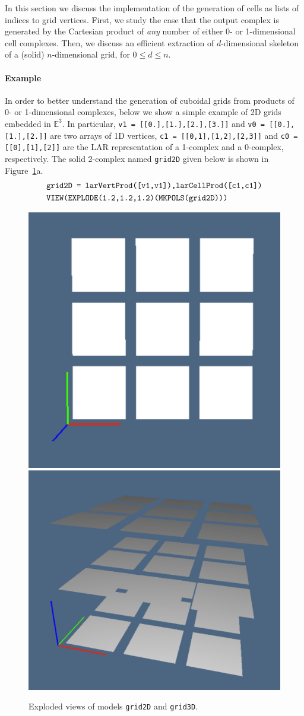\documentclass[11pt,oneside]{article}	%
\def\E{\mathbb{E}}
\begin{document}
In this section we discuss the implementation of the generation of cells as lists of indices to grid vertices. First, we study the case that the output complex is generated by the Cartesian product of \emph{any} number of either 0- or 1-dimensional cell complexes. Then, we discuss an efficient extraction of $d$-dimensional skeleton of a (solid) $n$-dimensional grid, for $0\leq d\leq n$.


\paragraph{Example}
In order to better understand the generation of cuboidal grids from products of 0- or 1-dimensional complexes, below we show a simple example of 2D grids embedded in $\E^3$.
In particular, \texttt{v1 = [[0.],[1.],[2.],[3.]]} and \texttt{v0 = [[0.],[1.],[2.]]} are two arrays of 1D vertices, \texttt{c1 = [[0,1],[1,2],[2,3]]} and \texttt{c0 = [[0],[1],[2]]} are the LAR representation of a 1-complex and a 0-complex, respectively. The solid 2-complex named \texttt{grid2D} given below is shown in Figure~\ref{fig:firstgrid23D}a.
\begin{align*}\scriptsize
&\texttt{grid2D = larVertProd([v1,v1]),larCellProd([c1,c1])}\\
&\texttt{VIEW(EXPLODE(1.2,1.2,1.2)(MKPOLS(grid2D)))}
\end{align*}

\begin{figure}[htbp] %
   \centering
   \includegraphics[width=0.458\linewidth]{images/grid2D} 
   \includegraphics[width=0.532\linewidth]{images/grid3D} 
   \caption{Exploded views of models \texttt{grid2D} and \texttt{grid3D}.}
   \label{fig:firstgrid23D}
\end{figure}
\end{document}
